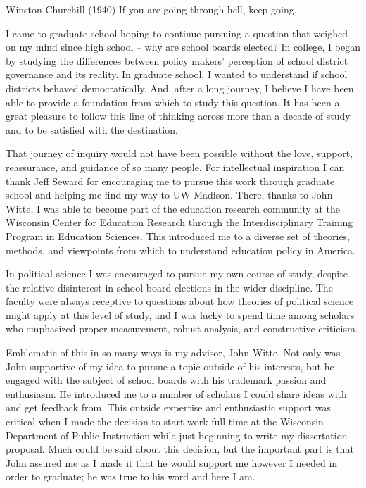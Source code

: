 \begin{wbepi}{Winston Churchill (1940)}
If you are going through hell, keep going. 
\end{wbepi}

I came to graduate school hoping to continue pursuing a question that weighed on 
my mind since high school -- why are school boards elected? In college, I began 
by studying the differences between policy makers' perception of school 
district governance and its reality. In graduate school, I wanted to understand 
if school districts behaved democratically. And, after a long journey, I believe 
I have been able to provide a foundation from which to study this question. It 
has been a great pleasure to follow this line of thinking across more than a 
decade of study and to be satisfied with the destination. 

That journey of inquiry would not have been possible without the love, support, 
reassurance, and guidance of so many people. For intellectual inspiration I can 
thank Jeff Seward for encouraging me to pursue this work through graduate school 
and helping me find my way to UW-Madison. There, thanks to John Witte, I was able to 
become part of the education research community at the Wisconsin Center for 
Education Research through the Interdisciplinary Training Program in Education 
Sciences. This introduced me to a diverse set of theories, methods, and viewpoints 
from which to understand education policy in America. 

In political science I was encouraged to pursue my own course of study, despite 
the relative disinterest 
in school board elections in the wider discipline. The faculty were always 
receptive to questions about how theories of political science might apply at this 
level of study, and I was lucky to spend time among scholars who emphasized 
proper measurement, robust analysis, and constructive criticism. 

Emblematic of this in so many ways is my advisor, John Witte. Not only was John 
supportive of my idea to pursue a topic outside of his interests, but he engaged 
with the subject of school boards with his trademark passion and enthusiasm. He 
introduced me to a number of scholars I could share ideas with and get feedback 
from. This outside expertise and enthusiastic support was critical when I made 
the decision to start work full-time at the Wisconsin Department of Public 
Instruction while just beginning to write my dissertation proposal. Much could 
be said about this decision, but the important part is that John assured me as 
I made it that he would support me however I needed in order to graduate;  
he was true to his word and here I am. 

